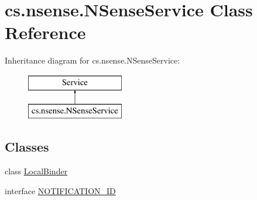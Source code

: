 \hypertarget{classcs_1_1nsense_1_1_n_sense_service}{\section{cs.\-nsense.\-N\-Sense\-Service Class Reference}
\label{classcs_1_1nsense_1_1_n_sense_service}
}
Inheritance diagram for cs.\-nsense.\-N\-Sense\-Service\-:\begin{figure}[H]
\begin{center}
\leavevmode
\includegraphics[height=2.000000cm]{classcs_1_1nsense_1_1_n_sense_service}
\end{center}
\end{figure}
\subsection*{Classes}
\begin{DoxyCompactItemize}
\item 
class \hyperlink{classcs_1_1nsense_1_1_n_sense_service_1_1_local_binder}{Local\-Binder}
\item 
interface \hyperlink{interfacecs_1_1nsense_1_1_n_sense_service_1_1_n_o_t_i_f_i_c_a_t_i_o_n___i_d}{N\-O\-T\-I\-F\-I\-C\-A\-T\-I\-O\-N\-\_\-\-I\-D}
\end{DoxyCompactItemize}
